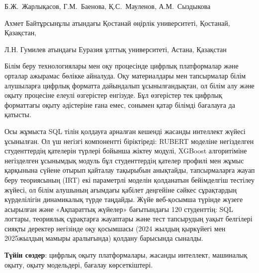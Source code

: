 
\begin{header}

Б.Ж.~Жарлықасов,
Г.М.~Баенова,
Қ.С.~Мауленов,
А.М.~Сыздыкова\envelope
\end{header}

\begin{affil}
Ахмет Байтұрсынұлы атындағы Қостанай өңірлік университеті, Қостанай, Қазақстан,

Л.Н. Гумилев атындағы Еуразия ұлттық университеті, Астана, Қазақстан

\end{affil}

Білім беру технологиялары мен оқу процесінде цифрлық платформалар және
орталар ажырамас бөлікке айналуда. Оқу материалдары мен тапсырмалар
білім алушыларға цифрлық форматта дайындалып ұсынылғандықтан, ол білім
алу және оқыту процесіне елеулі өзгерістер енгізуде. Бұл өзгерістер тек
цифрлық форматтағы оқыту әдістеріне ғана емес, сонымен қатар білімді
бағалауға да қатысты.

Осы жұмыста SQL тілін қолдауға арналған кешенді жасанды интеллект жүйесі
ұсынылған. Ол үш негізгі компонентті біріктіреді: RUBERT моделіне
негізделген студенттердің қателерін түрлері бойынша жіктеу модулі,
XGBoost алгоритіміне негізделген ұсынымдық модуль бұл студенттердің
қателер профилі мен жұмыс қарқынына сүйене отырып қайталау тақырыбын
анықтайды, тапсырмаларға жауап беру теориясының (IRT) екі параметрлі
моделін қолданатын бейімделгіш тестілеу жүйесі, ол білім алушының
ағымдағы қабілет деңгейіне сәйкес сұрақтардың күрделілігін динамикалық
түрде таңдайды. Жүйе веб-қосымша түрінде жүзеге асырылған және
«Ақпараттық жүйелер» бағытындағы 120 студенттің: SQL логтары, теориялық
сұрақтарға жауаптары және тест тапсырудың уақыт белгілері сияқты
деректер негізінде оқу қосымшасы (2024 жылдың қыркүйегі мен 2025жылдың
мамыры аралығында) қолдану барысында сыналды.

{\bfseries Түйін сөздер}: цифрлық оқыту платформалары, жасанды интеллект,
машиналық оқыту, оқыту модельдері, бағалау көрсеткіштері.

